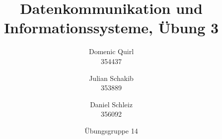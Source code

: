 \documentclass{../exercisesheet}
\title{Datenkommunikation und Informationssysteme, Übung 3}
\author{
    Domenic Quirl \\ 354437
    \and
    Julian Schakib \\ 353889
    \and 
    Daniel Schleiz \\ 356092
}
\date{Übungsgruppe 14}
\begin{document}
\maketitle
\pointtable

\begin{exercise}{1.5}
	\begin{subexercise}
	
	\end{subexercise}
	
	\begin{subexercise}
	
	\end{subexercise}
\end{exercise}

\begin{exercise}{3}
	\begin{subexercise}
	
	\end{subexercise}

	\begin{subexercise}
	
	\end{subexercise}
\end{exercise}
\end{document}
